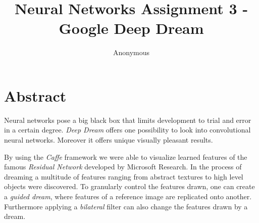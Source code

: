 \documentclass{article}[]
\begin{document}
	\title{Neural Networks Assignment 3 - Google Deep Dream}
	\author{Anonymous}
	\maketitle
	\lstset{
		basicstyle=\ttfamily,
		keywordstyle=\bfseries,
		language=Java,
		frame=single,
		aboveskip=11pt,
		belowskip=11pt,
		breaklines=true,
		breakatwhitespace=false,
		showspaces=false,
		showstringspaces=false,
		numbers=left,
		stepnumber=1,    
		firstnumber=1,
		numberfirstline=true
	}
	
\section*{Abstract}
Neural networks pose a big black box that limits development to trial and error in a certain degree.
\emph{Deep Dream} offers one possibility to look into convolutional neural networks.
Moreover it offers unique visually pleasant results.

By using the \emph{Caffe} framework we were able to visualize learned features of the famous \emph{Residual Network} developed by Microsoft Research.
In the process of dreaming a multitude of features ranging from abstract textures to high level objects were discovered.
To granularly control the features drawn, one can create a \emph{guided dream}, where features of a reference image are replicated onto another.
Furthermore applying a \emph{bilateral} filter can also change the features drawn by a dream.
















 

	
	
\end{document}
